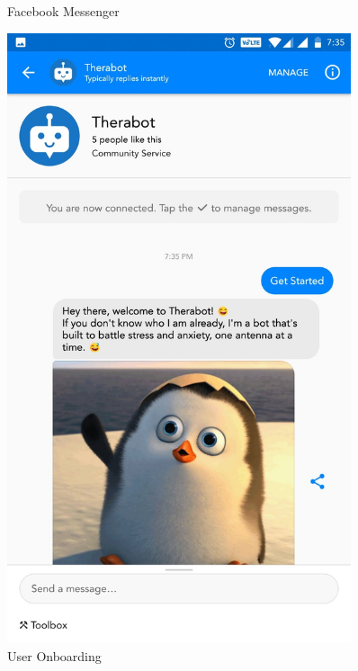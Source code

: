 \begin{figure}[H]
\begin{minipage}{0.45\textwidth}
        \caption{Facebook Messenger}
    \end{minipage}\hfill
    \begin{minipage}{0.45\textwidth}
        \centering
        \includegraphics[width=0.9\textwidth]{images/screenshots/chatbot/2.jpg}
        \caption{User Onboarding}
    \end{minipage}
\end{figure}
\vspace*{\fill}

\pagebreak

